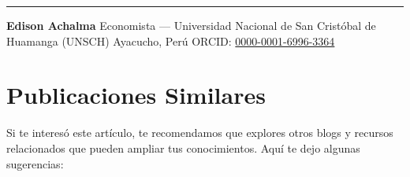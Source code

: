 \documentclass[
  doc,
  floatsintext,
  longtable,
  a4paper,
  nolmodern,
  notxfonts,
  notimes,
  12pt,
  colorlinks=true,linkcolor=blue,citecolor=blue,urlcolor=blue]{apa7}
\begin{document}
\begin{center}\rule{0.5\linewidth}{0.5pt}\end{center}

\textbf{Edison Achalma} Economista --- Universidad Nacional de San
Cristóbal de Huamanga (UNSCH) Ayacucho, Perú ORCID:
\href{https://orcid.org/0000-0001-6996-3364}{0000-0001-6996-3364}

\section{Publicaciones Similares}\label{publicaciones-similares}

Si te interesó este artículo, te recomendamos que explores otros blogs y
recursos relacionados que pueden ampliar tus conocimientos. Aquí te dejo
algunas sugerencias:
\end{document}
